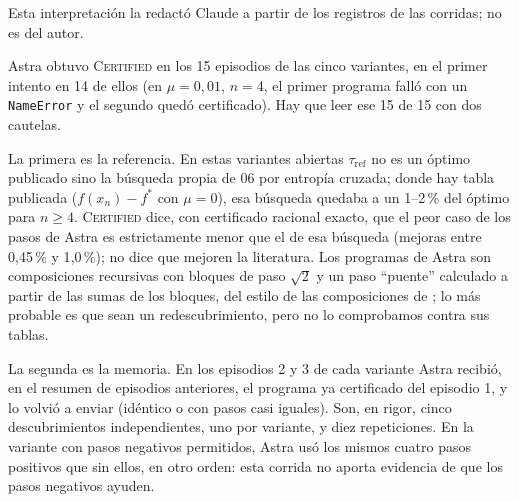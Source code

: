 Esta interpretación la redactó Claude a partir de los registros de las corridas; no es del autor.

Astra obtuvo \textsc{Certified} en los 15 episodios de las cinco variantes, en el primer intento en 14 de ellos (en $\mu = 0{,}01$, $n = 4$, el primer programa falló con un \texttt{NameError} y el segundo quedó certificado). Hay que leer ese 15 de 15 con dos cautelas.

La primera es la referencia. En estas variantes abiertas $\tau_{\mathrm{ref}}$ no es un óptimo publicado sino la búsqueda propia de 06 por entropía cruzada; donde hay tabla publicada ($f(x_n) - f^*$ con $\mu = 0$), esa búsqueda quedaba a un 1--2\,\% del óptimo para $n \ge 4$. \textsc{Certified} dice, con certificado racional exacto, que el peor caso de los pasos de Astra es estrictamente menor que el de esa búsqueda (mejoras entre 0{,}45\,\% y 1{,}0\,\%); no dice que mejoren la literatura. Los programas de Astra son composiciones recursivas con bloques de paso $\sqrt{2}$ y un paso ``puente'' calculado a partir de las sumas de los bloques, del estilo de las composiciones de \citet{GrimmerShuWang2024}; lo más probable es que sean un redescubrimiento, pero no lo comprobamos contra sus tablas.

La segunda es la memoria. En los episodios 2 y 3 de cada variante Astra recibió, en el resumen de episodios anteriores, el programa ya certificado del episodio 1, y lo volvió a enviar (idéntico o con pasos casi iguales). Son, en rigor, cinco descubrimientos independientes, uno por variante, y diez repeticiones. En la variante con pasos negativos permitidos, Astra usó los mismos cuatro pasos positivos que sin ellos, en otro orden: esta corrida no aporta evidencia de que los pasos negativos ayuden.
